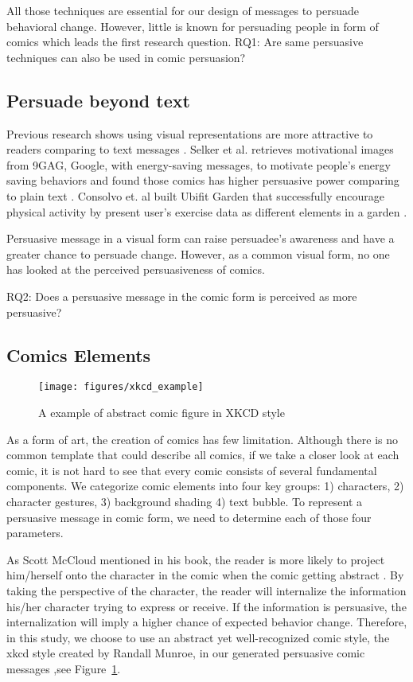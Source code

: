 All those techniques are essential for our design of messages to persuade behavioral change. However, little is known for persuading people in form of comics which leads the first research question. RQ1: Are same persuasive techniques can also be used in comic persuasion?

\subsection{Persuade beyond text}
Previous research shows using visual representations are more attractive to readers comparing to text messages \cite{selker2015sweetbuildinggreeter,consolvo2008activity}. Selker et al. retrieves motivational images from 9GAG, Google, with energy-saving messages, to motivate people's energy saving behaviors and found those comics has higher persuasive power comparing to plain text \cite{selker2015sweetbuildinggreeter}. Consolvo et. al built Ubifit Garden that successfully encourage physical activity by present user's exercise data as different elements in a garden \cite{consolvo2008activity}.

Persuasive message in a visual form can raise persuadee's awareness and have a greater chance to persuade change. However, as a common visual form, no one has looked at the perceived persuasiveness of comics.

RQ2: Does a persuasive message in the comic form is perceived as more persuasive?

\subsection{Comics Elements}
\begin{figure}
  \centering
  \texttt{[image: figures/xkcd\_example]}
  \caption{A example of abstract comic figure in XKCD style}
  \label{fig:xkcd}
\end{figure}

As a form of art, the creation of comics has few limitation. Although there is no common template that could describe all comics, if we take a closer look at each comic, it is not hard to see that every comic consists of several fundamental components. We categorize comic elements into four key groups: 1) characters, 2) character gestures, 3) background shading 4) text bubble. To represent a persuasive message in comic form, we need to determine each of those four parameters.

As Scott McCloud mentioned in his book, the reader is more likely to project him/herself onto the character in the comic when the comic getting abstract \cite{scott1993understanding}. By taking the perspective of the character, the reader will internalize the information his/her character trying to express or receive. If the information is persuasive, the internalization will imply a higher chance of expected behavior change. Therefore, in this study, we choose to use an abstract yet well-recognized comic style, the xkcd style created by Randall Munroe, in our generated persuasive comic messages \cite{munroe2009xkcd},see Figure~\ref{fig:xkcd}.

